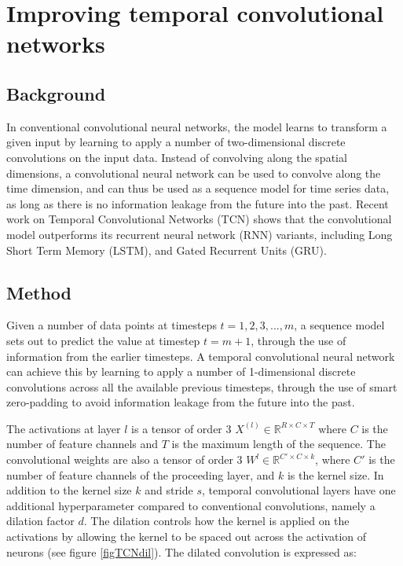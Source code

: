 \documentclass[a4paper, twoside]{article}
\begin{document}
\section{Improving temporal convolutional networks}
\subsection{Background}
In conventional convolutional neural networks, the model learns to transform a given input by learning to apply a number of two-dimensional discrete convolutions on the input data. Instead of convolving along the spatial dimensions, a convolutional neural network can be used to convolve along the time dimension, and can thus be used as a sequence model for time series data, as long as there is no information leakage from the future into the past. Recent work on Temporal Convolutional Networks (TCN) \cite{tcn} shows that the convolutional model outperforms its recurrent neural network (RNN) variants, including Long Short Term Memory (LSTM), and Gated Recurrent Units (GRU). 

\subsection{Method}
Given a number of data points at timesteps $t = 1, 2, 3, ..., m$, a sequence model sets out to predict the value at timestep $t = m+1$, through the use of information from the earlier timesteps. A temporal convolutional neural network can achieve this by learning to apply a number of 1-dimensional discrete convolutions across all the available previous timesteps, through the use of smart zero-padding to avoid information leakage from the future into the past.

The activations at layer $l$ is a tensor of order 3 $X^{(l)} \in \mathbb{R}^{R \times C \times T}$ where $C$ is the number of feature channels and $T$ is the maximum length of the sequence. The convolutional weights are also a tensor of order 3 $W^l \in \mathbb{R}^{C' \times C \times k}$, where $C'$ is the number of feature channels of the proceeding layer, and $k$ is the kernel size. In addition to the kernel size $k$ and stride $s$, temporal convolutional layers have one additional hyperparameter compared to conventional convolutions, namely a dilation factor $d$. The dilation controls how the kernel is applied on the activations by allowing the kernel to be spaced out across the activation of neurons (see figure \ref{figTCNdil}). The dilated convolution is expressed as:
\end{document}
